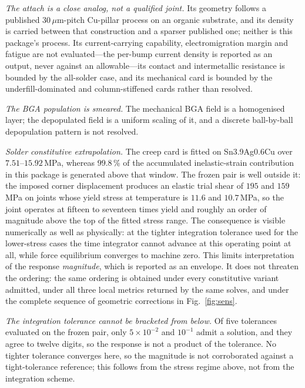 \documentclass[journal]{IEEEtran}
\begin{document}
\emph{The attach is a close analog, not a qualified joint.} Its geometry follows a published
30\,$\mu$m-pitch Cu-pillar process on an organic substrate, and its density is carried between
that construction and a sparser published one; neither is this package's process. Its
current-carrying capability, electromigration margin and fatigue are not evaluated---the
per-bump current density is reported as an output, never against an allowable---its contact
and intermetallic resistance is bounded by the all-solder case, and its mechanical card is
bounded by the underfill-dominated and column-stiffened cards rather than resolved.

\emph{The BGA population is smeared.} The mechanical BGA field is a homogenised layer; the
depopulated field is a uniform scaling of it, and a discrete ball-by-ball depopulation pattern is
not resolved.

\emph{Solder constitutive extrapolation.} The creep card is fitted on Sn3.9Ag0.6Cu over
$7.51$--$15.92$\,MPa, whereas $99.8$\,\% of the accumulated inelastic-strain contribution in
this package is generated above that window. The frozen pair is well outside it: the imposed
corner displacement produces an elastic trial shear of $195$ and $159$\,MPa on joints whose
yield stress at temperature is $11.6$ and $10.7$\,MPa, so the joint operates at fifteen to
seventeen times yield and roughly an order of magnitude above the top of the fitted stress
range. The consequence is visible numerically as well as physically: at the tighter
integration tolerance used for the lower-stress cases the time integrator cannot advance at
this operating point at all, while force equilibrium converges to machine zero. This limits
interpretation of the response \emph{magnitude}, which is reported as an envelope. It does
not threaten the ordering: the same ordering is obtained under every constitutive variant
admitted, under all three local metrics returned by the same solves, and under the complete
sequence of geometric corrections in Fig.~\ref{fig:sens}.

\emph{The integration tolerance cannot be bracketed from below.} Of five tolerances evaluated
on the frozen pair, only $5\times10^{-2}$ and $10^{-1}$ admit a solution, and they agree to
twelve digits, so the response is not a product of the tolerance. No tighter tolerance
converges here, so the magnitude is not corroborated against a tight-tolerance reference;
this follows from the stress regime above, not from the integration scheme.
\end{document}
